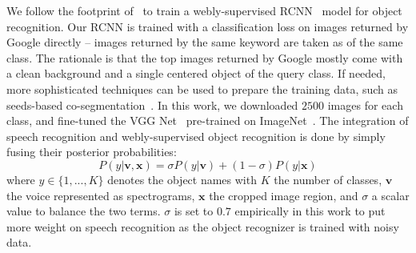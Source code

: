 \documentclass[runningheads]{llncs}
\begin{document}
We follow the footprint of~\citep{webly:cnn} to train a webly-supervised RCNN~\citep{rcnn} model for object recognition. Our RCNN is trained with a classification loss on images returned by Google directly -- images returned by the same keyword are taken as of the same class. The rationale is that the top images returned by Google mostly come with a clean background and a single centered object of the query class.  If needed, more sophisticated techniques can be used to prepare the training data, such as seeds-based co-segmentation~\citep{webly:cnn}.  In this work, we downloaded $2500$ images for each class, and fine-tuned the VGG Net~\citep{vgg16} pre-trained on ImageNet~\citep{imagenet}. The integration of speech recognition and webly-supervised object recognition is done by simply fusing their posterior probabilities: 
\begin{equation}
  P(y | \mathbf{v}, \mathbf{x}) = \sigma  P(y| \mathbf{v}) + (1-\sigma)  P(y|\mathbf{x})
\end{equation}
where $y \in \{1, ..., K \}$ denotes the object names with $K$ the number of classes, $\mathbf{v}$ the voice represented as spectrograms, $\mathbf{x}$ the cropped image region, and $\sigma$ a scalar value to balance the two terms. $\sigma$ is set to $0.7$ empirically in this work to put more weight on speech recognition as the object recognizer is trained with noisy data.      
 



 
\end{document}

